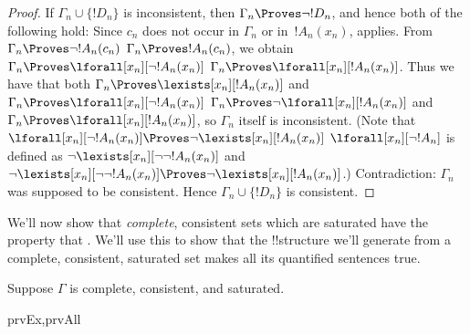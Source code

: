 \documentclass[../../../include/open-logic-section]{subfiles}
\begin{document}
\begin{proof}
If $\Gamma_n \cup \{!D_n\}$ is inconsistent, then $\Gamma_n
\Proves \lnot !D_n$, and hence both of the following hold:
Since $c_n$ does not occur in
$\Gamma_n$ or in~$!A_n(x_n)$, 
 applies.
From 
{$\Gamma_n \Proves \lnot !A_n(c_n)$}
{$\Gamma_n \Proves !A_n(c_n)$},
we obtain
{$\Gamma_n \Proves \lforall[x_n][\lnot !A_n(x_n)]$}
{$\Gamma_n \Proves \lforall[x_n][!A_n(x_n)]$}.
Thus we have that both
{$\Gamma_n \Proves \lexists[x_n][!A_n(x_n)]$ and
$\Gamma_n \Proves \lforall[x_n][\lnot !A_n(x_n)]$}
{$\Gamma_n \Proves \lnot\lforall[x_n][!A_n(x_n)]$ and
$\Gamma_n \Proves \lforall[x_n][!A_n(x_n)]$},
so $\Gamma_n$ itself is inconsistent.
{(Note that
{$\lforall[x_n][\lnot !A_n(x_n)] \Proves
  \lnot\lexists[x_n][!A_n(x_n)]$}
{$\lforall[x_n][\lnot !A_n]$ is defined as
  $\lnot\lexists[x_n][\lnot\lnot !A_n(x_n)]$ and
  $\lnot\lexists[x_n][\lnot\lnot !A_n(x_n)] \Proves
  \lnot\lexists[x_n][!A_n(x_n)]$}.)}{}
Contradiction: $\Gamma_n$ was supposed to be consistent.  Hence
$\Gamma_n \cup \{ !D_n\}$ is consistent.
\end{proof}

\begin{explain}
We'll now show that \emph{complete}, consistent sets which are
saturated have the property that . We'll use this to show that the !!{structure} we'll
generate from a complete, consistent, saturated set makes all its
quantified sentences true.
\end{explain}

\begin{prop}
Suppose $\Gamma$ is complete, consistent, and saturated.
\begin{tagenumerate}{prvEx,prvAll}
\end{tagenumerate}
\end{prop}
\end{document}
